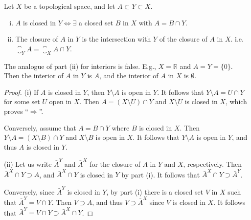 \documentclass[a4paper]{article}
\begin{document}
\begin{proposition}\label{prop:4.6}
    Let $X$ be a topological space, and let $A \subset Y \subset X$.

    \begin{enumerate}[(i)]
        \item $A$ is closed in $Y \Longleftrightarrow \exists$ a closed set $B$ in $X$ with $A=B \cap Y$.

        \item The closure of $A$ in $Y$ is the intersection with $Y$ of the closure of $A$ in $X$. i.e. $ \closure_Y A = \closure_X A \cap Y $.
    \end{enumerate}
\end{proposition}

\begin{remark}
    The analogue of part (ii) for interiors is false. E.g., $X=\mathbb{R}$ and $A=Y=\{0\}$. Then the interior of $A$ in $Y$ is $A$, and the interior of $A$ in $X$ is $\emptyset$.
\end{remark}

\begin{proof}
    (i) If $A$ is closed in $Y$, then $Y \setminus A$ is open in $Y$. It follows that $Y \setminus A=U \cap Y$ for some set $U$ open in $X$. Then $A=(X \setminus U) \cap Y$ and $X \setminus U$ is closed in $X$, which proves ``$\Longrightarrow $''.

Conversely, assume that $A=B \cap Y$ where $B$ is closed in $X$. Then $Y \setminus A=(X \setminus B) \cap Y$ and $X \setminus B$ is open in $X$. It follows that $Y \setminus A$ is open in $Y$, and thus $A$ is closed in $Y$.

(ii) Let us write $\bar{A}^{Y}$ and $\bar{A}^{X}$ for the closure of $A$ in $Y$ and $X$, respectively. Then $\bar{A}^{X} \cap Y \supset A$, and $\bar{A}^{X} \cap Y$ is closed in $Y$ by part (i). It follows that $\bar{A}^{X} \cap Y \supset \bar{A}^{Y}$.

Conversely, since $\bar{A}^{Y}$ is closed in $Y$, by part (i) there is a closed set $V$ in $X$ such that $\bar{A}^{Y}=V \cap Y$. Then $V \supset A$, and thus $V \supset \bar{A}^{X}$ since $V$ is closed in $X$. It follows that $\bar{A}^{Y}=V \cap Y \supset \bar{A}^{X} \cap Y$.
\end{proof}
\end{document}

